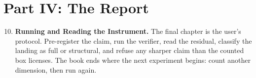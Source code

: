 \section*{Part IV: The Report}

\begin{enumerate}
\setcounter{enumi}{9}
\item \textbf{Running and Reading the Instrument.}
The final chapter is the user's protocol. Pre-register the claim, run the
verifier, read the residual, classify the landing as full or structural, and
refuse any sharper claim than the counted box licenses. The book ends where
the next experiment begins: count another dimension, then run again.
\end{enumerate}

